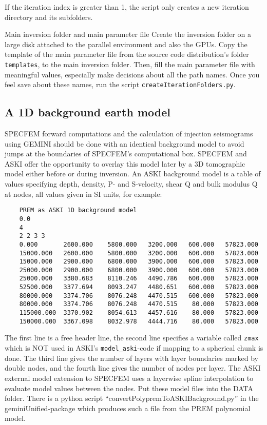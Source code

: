 If the iteration index is greater than 1, the script only creates a new iteration directory and its subfolders.
%
\begin{actionbox}[label={action:inversion-folder},float=h!]{Main inversion folder and main parameter file}
   Create the inversion folder on a large disk attached to the parallel environment and also the GPUs. Copy the template of the main parameter file from the source code distribution's folder \verb+templates+, to the main inversion folder. Then, fill the main parameter file with meaningful values, especially make decisions about all the path names. Once you feel save about these names, run the script \verb+createIterationFolders.py+.
\end{actionbox}
%
\subsection{A 1D background earth model}
%
  SPECFEM forward computations and the calculation of injection seismograms using GEMINI should be done with an identical background model to avoid jumps at the boundaries of SPECFEM's computational box. SPECFEM and ASKI offer the opportunity to overlay this model later by a 3D tomographic model either before or during inversion. An ASKI background model is a table of values specifying depth, density, P- and S-velocity, shear Q and bulk modulus Q at nodes, all values given in SI units, for example:
\begin{verbatim}
	PREM as ASKI 1D background model
	0.0
	4
	2 2 3 3
	0.000       2600.000    5800.000   3200.000   600.000   57823.000
	15000.000   2600.000    5800.000   3200.000   600.000   57823.000
	15000.000   2900.000    6800.000   3900.000   600.000   57823.000
	25000.000   2900.000    6800.000   3900.000   600.000   57823.000
	25000.000   3380.683    8110.246   4490.786   600.000   57823.000
	52500.000   3377.694    8093.247   4480.651   600.000   57823.000
	80000.000   3374.706    8076.248   4470.515   600.000   57823.000
	80000.000   3374.706    8076.248   4470.515    80.000   57823.000
	115000.000  3370.902    8054.613   4457.616    80.000   57823.000
	150000.000  3367.098    8032.978   4444.716    80.000   57823.000
\end{verbatim}
%
 The first line is a free header line, the second line specifies a variable called \verb+zmax+ which is NOT used in ASKI's \verb+model_aski+-code if mapping to a spherical chunk is done. The third line gives the number of layers with layer boundaries marked by double nodes, and the fourth line gives the number of nodes per layer. The ASKI external model extension to SPECFEM uses a layerwise spline interpolation to evaluate model values between the nodes. Put these model files into the DATA folder. There is a python script ``convertPolypremToASKIBackground.py'' in the geminiUnified-package which produces such a file from the PREM polynomial model.

